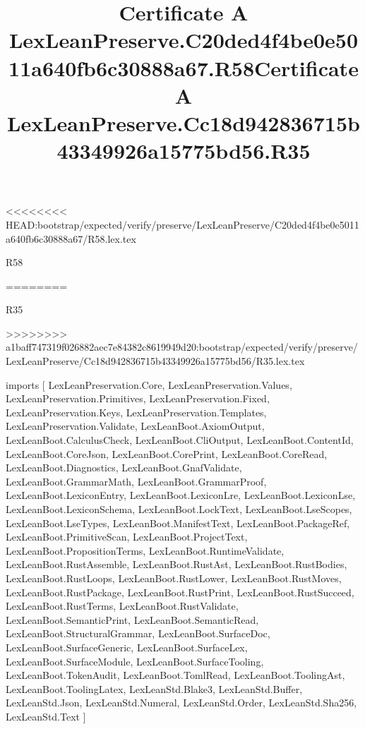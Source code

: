 <<<<<<<< HEAD:bootstrap/expected/verify/preserve/LexLeanPreserve/C20ded4f4be0e5011a640fb6c30888a67/R58.lex.tex
\begin{lexlean}{R58}
\title{Certificate A LexLeanPreserve.C20ded4f4be0e5011a640fb6c30888a67.R58}
========
\begin{lexlean}{R35}
\title{Certificate A LexLeanPreserve.Cc18d942836715b43349926a15775bd56.R35}
>>>>>>>> a1baff747319f026882aec7e84382c8619949d20:bootstrap/expected/verify/preserve/LexLeanPreserve/Cc18d942836715b43349926a15775bd56/R35.lex.tex
\begin{coremodule}
imports [
  LexLeanPreservation.Core,
  LexLeanPreservation.Values,
  LexLeanPreservation.Primitives,
  LexLeanPreservation.Fixed,
  LexLeanPreservation.Keys,
  LexLeanPreservation.Templates,
  LexLeanPreservation.Validate,
  LexLeanBoot.AxiomOutput,
  LexLeanBoot.CalculusCheck,
  LexLeanBoot.CliOutput,
  LexLeanBoot.ContentId,
  LexLeanBoot.CoreJson,
  LexLeanBoot.CorePrint,
  LexLeanBoot.CoreRead,
  LexLeanBoot.Diagnostics,
  LexLeanBoot.GnafValidate,
  LexLeanBoot.GrammarMath,
  LexLeanBoot.GrammarProof,
  LexLeanBoot.LexiconEntry,
  LexLeanBoot.LexiconLre,
  LexLeanBoot.LexiconLse,
  LexLeanBoot.LexiconSchema,
  LexLeanBoot.LockText,
  LexLeanBoot.LseScopes,
  LexLeanBoot.LseTypes,
  LexLeanBoot.ManifestText,
  LexLeanBoot.PackageRef,
  LexLeanBoot.PrimitiveScan,
  LexLeanBoot.ProjectText,
  LexLeanBoot.PropositionTerms,
  LexLeanBoot.RuntimeValidate,
  LexLeanBoot.RustAssemble,
  LexLeanBoot.RustAst,
  LexLeanBoot.RustBodies,
  LexLeanBoot.RustLoops,
  LexLeanBoot.RustLower,
  LexLeanBoot.RustMoves,
  LexLeanBoot.RustPackage,
  LexLeanBoot.RustPrint,
  LexLeanBoot.RustSucceed,
  LexLeanBoot.RustTerms,
  LexLeanBoot.RustValidate,
  LexLeanBoot.SemanticPrint,
  LexLeanBoot.SemanticRead,
  LexLeanBoot.StructuralGrammar,
  LexLeanBoot.SurfaceDoc,
  LexLeanBoot.SurfaceGeneric,
  LexLeanBoot.SurfaceLex,
  LexLeanBoot.SurfaceModule,
  LexLeanBoot.SurfaceTooling,
  LexLeanBoot.TokenAudit,
  LexLeanBoot.TomlRead,
  LexLeanBoot.ToolingAst,
  LexLeanBoot.ToolingLatex,
  LexLeanStd.Blake3,
  LexLeanStd.Buffer,
  LexLeanStd.Json,
  LexLeanStd.Numeral,
  LexLeanStd.Order,
  LexLeanStd.Sha256,
  LexLeanStd.Text
]


\end{coremodule}
\end{lexlean}
\end{lexlean}

